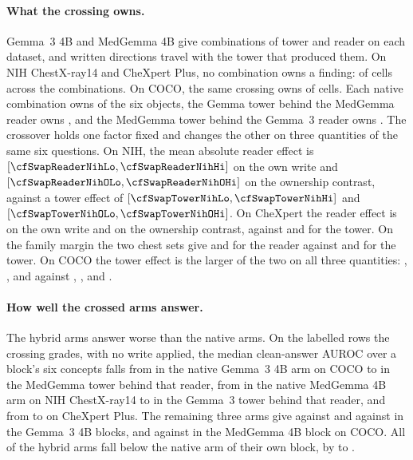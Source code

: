 \documentclass{article}
\begin{document}
\paragraph{What the crossing owns.} Gemma~3 4B and MedGemma 4B give \cfSwapCombos{} combinations of tower and reader on each dataset, and written directions travel with the tower that produced them. On NIH ChestX-ray14 and CheXpert Plus, no combination owns a finding: \cfSwapChestOwned{} of \cfSwapChestCells{} cells across the \cfSwapChestCombos{} combinations. On COCO, the same crossing owns \cfSwapCocoOwned{} of \cfSwapCocoCells{} cells. Each native combination owns \cfSwapCocoNativeMin{} of the six objects, the Gemma tower behind the MedGemma reader owns \cfSwapCocoGemmaTowerCross{}, and the MedGemma tower behind the Gemma~3 reader owns \cfSwapCocoMedTowerCross{}. The crossover holds one factor fixed and changes the other on three quantities of the same six questions. On NIH, the mean absolute reader effect is \cfSwapReaderNihMin{} $[\cfSwapReaderNihLo,\cfSwapReaderNihHi]$ on the own write and \cfSwapReaderNihOMin{} $[\cfSwapReaderNihOLo,\cfSwapReaderNihOHi]$ on the ownership contrast, against a tower effect of \cfSwapTowerNihMin{} $[\cfSwapTowerNihLo,\cfSwapTowerNihHi]$ and \cfSwapTowerNihOMin{} $[\cfSwapTowerNihOLo,\cfSwapTowerNihOHi]$. On CheXpert the reader effect is \cfSwapReaderChexMin{} on the own write and \cfSwapReaderChexOMin{} on the ownership contrast, against \cfSwapTowerChexMin{} and \cfSwapTowerChexOMin{} for the tower. On the family margin the two chest sets give \cfSwapReaderNihMMin{} and \cfSwapReaderChexMMin{} for the reader against \cfSwapTowerNihMMin{} and \cfSwapTowerChexMMin{} for the tower. On COCO the tower effect is the larger of the two on all three quantities: \cfSwapTowerCocoMin{}, \cfSwapTowerCocoOMin{}, and \cfSwapTowerCocoMMin{} against \cfSwapReaderCocoMin{}, \cfSwapReaderCocoOMin{}, and \cfSwapReaderCocoMMin{}.

\paragraph{How well the crossed arms answer.} The hybrid arms answer worse than the native arms. On the labelled rows the crossing grades, with no write applied, the median clean-answer AUROC over a block's six concepts falls from \cfSwapAnsNativeGemCoco{} in the native Gemma~3 4B arm on COCO to \cfSwapAnsHybridGemCoco{} in the MedGemma tower behind that reader, from \cfSwapAnsNativeMedNih{} in the native MedGemma 4B arm on NIH ChestX-ray14 to \cfSwapAnsHybridMedNih{} in the Gemma~3 tower behind that reader, and from \cfSwapAnsNativeMedChex{} to \cfSwapAnsHybridMedChex{} on CheXpert Plus. The remaining three arms give \cfSwapAnsNativeGemNih{} against \cfSwapAnsHybridGemNih{} and \cfSwapAnsNativeGemChex{} against \cfSwapAnsHybridGemChex{} in the Gemma~3 4B blocks, and \cfSwapAnsNativeMedCoco{} against \cfSwapAnsHybridMedCoco{} in the MedGemma 4B block on COCO. All \cfSwapAnsWorse{} of the \cfSwapAnsArms{} hybrid arms fall below the native arm of their own block, by \cfSwapAnsDropMin{} to \cfSwapAnsDropMax{}.
\end{document}
